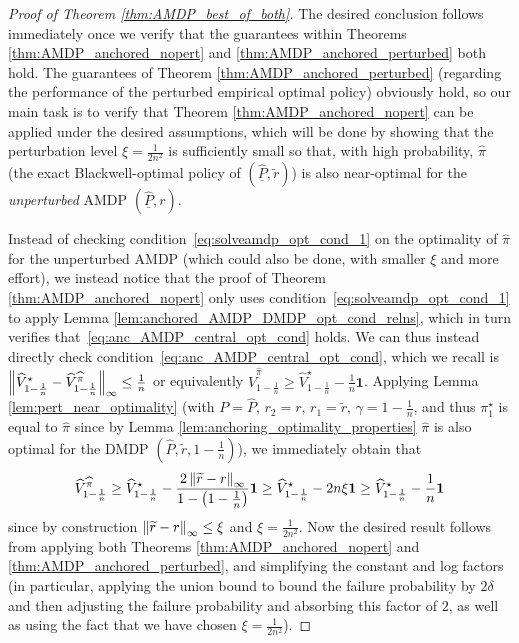 \documentclass{article}
\theoremstyle{plain}
\theoremstyle{plain}
\theoremstyle{remark}
\theoremstyle{plain}
\theoremstyle{plain}
\newcommand{\Phat}{\widehat{P}}
\newcommand{\Vhat}{\widehat{V}}
\newcommand{\pistar}{\pi^\star}
\newcommand{\one}{\mathbf{1}}
\newcommand{\pihat}{\widehat{\pi}}
\newcommand{\Phatanc}{\underline{\Phat}}
\begin{document}
\begin{proof}[Proof of Theorem \ref{thm:AMDP_best_of_both}]
    The desired conclusion follows immediately once we verify that the guarantees within Theorems \ref{thm:AMDP_anchored_nopert} and \ref{thm:AMDP_anchored_perturbed} both hold. The guarantees of Theorem \ref{thm:AMDP_anchored_perturbed} (regarding the performance of the perturbed empirical optimal policy) obviously hold, so our main task is to verify that Theorem \ref{thm:AMDP_anchored_nopert} can be applied under the desired assumptions, which will be done by showing that the perturbation level $\xi = \frac{1}{2n^2}$ is sufficiently small so that, with high probability, $\pihat$ (the exact Blackwell-optimal policy of $(\Phatanc, \widetilde{r})$) is also near-optimal for the \textit{unperturbed} AMDP $(\Phatanc, r)$.
    
    Instead of checking condition~\eqref{eq:solveamdp_opt_cond_1} on the optimality of $\pihat$ for the unperturbed AMDP (which could also be done, with smaller $\xi$ and more effort), we instead notice that the proof of Theorem \ref{thm:AMDP_anchored_nopert} only uses condition~\eqref{eq:solveamdp_opt_cond_1} to apply Lemma \ref{lem:anchored_AMDP_DMDP_opt_cond_relns}, which in turn verifies that~\eqref{eq:anc_AMDP_central_opt_cond} holds. We can thus instead directly check condition~\eqref{eq:anc_AMDP_central_opt_cond}, which we recall is $\infnorm{\Vhat^{\star}_{1-\frac{1}{n}} - \Vhat^{\pihat}_{1-\frac{1}{n}}}  \leq \frac{1}{n}$ or equivalently $\Vhat^{\pihat}_{1-\frac{1}{n}} \geq \Vhat^{\star}_{1-\frac{1}{n}} - \frac{1}{n} \one$. Applying Lemma \ref{lem:pert_near_optimality} (with $P = \Phat$, $r_2 = r$, $r_1 = \widetilde{r}$, $\gamma = 1-\frac{1}{n}$, and thus $\pistar_1$ is equal to $\pihat$ since by Lemma \ref{lem:anchoring_optimality_properties} $\pihat$ is also optimal for the DMDP $(\Phat, \widetilde{r}, 1-\frac{1}{n})$), we immediately obtain that
    \[
        \Vhat^{\pihat}_{1-\frac{1}{n}} \geq \Vhat^{\star}_{1-\frac{1}{n}} - \frac{2 \infnorm{\widetilde{r} - r}}{1 - \left(1 - \frac{1}{n} \right)} \one \geq \Vhat^{\star}_{1-\frac{1}{n}} - 2 n \xi \one \geq \Vhat^{\star}_{1-\frac{1}{n}} - \frac{1}{n} \one
    \]
    since by construction $\left\Vert \widetilde{r} - r\right\Vert _{\infty} \leq \xi$ and $\xi = \frac{1}{2n^2}$. Now the desired result follows from applying both Theorems \ref{thm:AMDP_anchored_nopert} and \ref{thm:AMDP_anchored_perturbed}, and simplifying the constant and log factors (in particular, applying the union bound to bound the failure probability by $2 \delta$ and then adjusting the failure probability and absorbing this factor of $2$, as well as using the fact that we have chosen $\xi = \frac{1}{2n^2}$).
\end{proof}
\end{document}
